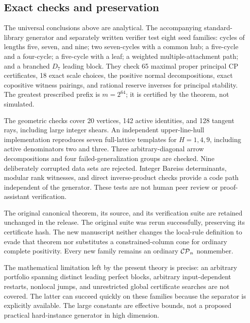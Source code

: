 \subsection{Exact checks and preservation}
The universal conclusions above are analytical. The accompanying standard-library generator and separately written verifier test eight seed families: cycles of lengths five, seven, and nine; two seven-cycles with a common hub; a five-cycle and a four-cycle; a five-cycle with a leaf; a weighted multiple-attachment path; and a branched $D_7$ leading block. They check 65 maximal proper principal CP certificates, 18 exact scale choices, the positive normal decompositions, exact copositive witness pairings, and rational reserve inverses for principal stability. The greatest prescribed prefix is $m=2^{64}$; it is certified by the theorem, not simulated.

The geometric checks cover 20 vertices, 142 active identities, and 128 tangent rays, including large integer shears. An independent upper-line-hull implementation reproduces seven full-lattice templates for $H=1,4,9$, including active denominators two and three. Three arbitrary-diagonal arrow decompositions and four failed-generalization groups are checked. Nine deliberately corrupted data sets are rejected. Integer Bareiss determinants, modular rank witnesses, and direct inverse-product checks provide a code path independent of the generator. These tests are not human peer review or proof-assistant verification.

The original canonical theorem, its source, and its verification suite are retained unchanged in the release. The original suite was rerun successfully, preserving its certificate hash. The new manuscript neither changes the local-rule definition to evade that theorem nor substitutes a constrained-column cone for ordinary complete positivity. Every new family remains an ordinary $\mathcal{CP}_n$ nonmember.

The mathematical limitation left by the present theory is precise: an arbitrary portfolio spanning distinct leading perfect blocks, arbitrary input-dependent restarts, nonlocal jumps, and unrestricted global certificate searches are not covered. The latter can succeed quickly on these families because the separator is explicitly available. The large constants are effective bounds, not a proposed practical hard-instance generator in high dimension.
